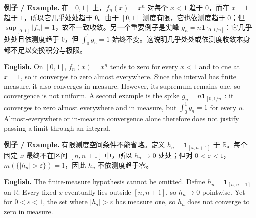 \documentclass[UTF8,11pt,a4paper]{ctexart}
\newcommand{\EN}[1]{\par\noindent\textbf{English.} #1\par}
\newcommand{\EX}[2]{\par\noindent\textbf{例子 / Example.} #1\par\EN{#2}}
\begin{document}
\EX{在 $[0,1]$ 上，$f_n(x)=x^n$ 对每个 $x<1$ 趋于 $0$，而在 $x=1$ 趋于 $1$，所以它几乎处处趋于 $0$。由于 $[0,1]$ 测度有限，它也依测度趋于 $0$；但 $\sup_{[0,1]}|f_n|=1$，故不一致收敛。另一个重要例子是尖峰 $g_n=n\mathbf1_{[0,1/n]}$：它几乎处处且依测度趋于 $0$，但 $\int_0^1g_n=1$ 始终不变。这说明几乎处处或依测度收敛本身都不足以交换积分与极限。}{On $[0,1]$, $f_n(x)=x^n$ tends to zero for every $x<1$ and to one at $x=1$, so it converges to zero almost everywhere. Since the interval has finite measure, it also converges in measure. However, its supremum remains one, so convergence is not uniform. A second example is the spike $g_n=n\mathbf1_{[0,1/n]}$: it converges to zero almost everywhere and in measure, but $\int_0^1g_n=1$ for every $n$. Almost-everywhere or in-measure convergence alone therefore does not justify passing a limit through an integral.}
\EX{有限测度空间条件不能省略。定义 $h_n=\mathbf1_{[n,n+1]}$ 于 $\mathbb R$。每个固定 $x$ 最终不在区间 $[n,n+1]$ 中，所以 $h_n\to0$ 处处；但对 $0<\varepsilon<1$，$m(\{|h_n|>\varepsilon\})=1$，因此 $h_n$ 不依测度趋于零。}{The finite-measure hypothesis cannot be omitted. Define $h_n=\mathbf1_{[n,n+1]}$ on $\mathbb R$. Every fixed $x$ eventually lies outside $[n,n+1]$, so $h_n\to0$ pointwise. Yet for $0<\varepsilon<1$, the set where $|h_n|>\varepsilon$ has measure one, so $h_n$ does not converge to zero in measure.}
\end{document}
